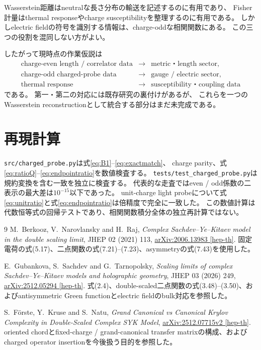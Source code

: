 \documentclass[a4paper,11pt]{ltjsarticle}
\numberwithin{equation}{section}
\begin{document}
Wasserstein距離はneutralな長さ分布の輸送を記述するのに有用であり、
Fisher計量はthermal responseやcharge susceptibilityを整理するのに有用である。
しかしelectric fieldの符号を識別する情報は、charge-oddな相関関数にある。
この三つの役割を混同しない方がよい。

したがって現時点の作業仮説は
\begin{equation}
 \begin{array}{rcl}
 \text{charge-even length / correlator data}
 &\longrightarrow& \text{metric・length sector},\\
 \text{charge-odd charged-probe data}
 &\longrightarrow& \text{gauge / electric sector},\\
 \text{thermal response}
 &\longrightarrow& \text{susceptibility・coupling data}
 \end{array}
 \label{eq:roles}
\end{equation}
である。
第一・第二の対応には既存研究の裏付けがあるが、
これらを一つのWasserstein reconstructionとして統合する部分はまだ未完成である。

\section{再現計算}
\texttt{src/charged\_probe.py}は式\eqref{eq:B1}--\eqref{eq:exactmatch}、
charge parity、式\eqref{eq:ratioQ}--\eqref{eq:endpointratio}を数値検査する。
\texttt{tests/test\_charged\_probe.py}は規約変換を含む一致を独立に検査する。
代表的な走査ではeven / odd係数の二表示の最大差は$10^{-15}$以下であった。
unit-charge light probeについて式\eqref{eq:unitratio}と式\eqref{eq:endpointratio}は倍精度で完全に一致した。
この数値計算は代数恒等式の回帰テストであり、相関関数積分全体の独立再計算ではない。

\begin{thebibliography}{9}
M.~Berkooz, V.~Narovlansky and H.~Raj,
\emph{Complex Sachdev--Ye--Kitaev model in the double scaling limit},
JHEP 02 (2021) 113,
\href{https://arxiv.org/abs/2006.13983}{arXiv:2006.13983 [hep-th]}.
固定電荷の式(5.17)、二点関数の式(7.21)--(7.23)、asymmetryの式(7.43)を使用した。

E.~Gubankova, S.~Sachdev and G.~Tarnopolsky,
\emph{Scaling limits of complex Sachdev--Ye--Kitaev models and holographic geometry},
JHEP 03 (2026) 249,
\href{https://arxiv.org/abs/2512.05294}{arXiv:2512.05294 [hep-th]}.
式(2.4)、double-scaled二点関数の式(3.48)--(3.50)、およびantisymmetric Green functionとelectric fieldのbulk対応を参照した。

S.~F\"orste, Y.~Kruse and S.~Natu,
\emph{Grand Canonical vs Canonical Krylov Complexity in Double-Scaled Complex SYK Model},
\href{https://arxiv.org/abs/2512.07715v2}{arXiv:2512.07715v2 [hep-th]}.
oriented chordとfixed-charge / grand-canonical transfer matrixの構成、およびcharged operator insertionを今後扱う目的を参照した。
\end{thebibliography}
\end{document}
